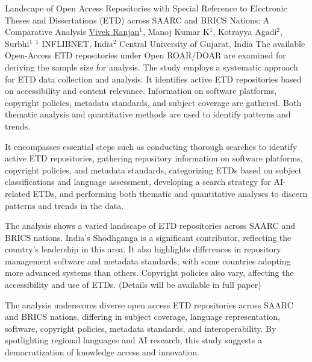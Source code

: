 \begin{abstract_online}{Landscape of Open Access Repositories with Special Reference to Electronic Theses and Dissertations (ETD) across SAARC and BRICS Nations: A Comparative Analysis}{%
        \underline{Vivek Ranjan}$^{1}$, Manoj Kumar K$^{1}$, Kotrayya  Agadi$^{2}$, Surbhi$^{1}$}{%
        }{%
        $^1$ INFLIBNET, India\newline{}$^2$ Central University of Gujarat, India}
        The available Open-Access ETD repositories under Open ROAR/DOAR are examined for deriving the sample size for analysis. The study employs a systematic approach for ETD data collection and analysis. It identifies active ETD repositories based on accessibility and content relevance. Information on software platforms, copyright policies, metadata standards, and subject coverage are gathered. Both thematic analysis and quantitative methods are used to identify patterns and trends.

        It encompasses essential steps such as conducting thorough searches to identify active ETD repositories, gathering repository information on software platforms, copyright policies, and metadata standards, categorizing ETDs based on subject classifications and language assessment, developing a search strategy for AI-related ETDs, and performing both thematic and quantitative analyses to discern patterns and trends in the data.

        The analysis shows a varied landscape of ETD repositories across SAARC and BRICS nations. India's Shodhganga is a significant contributor, reflecting the country's leadership in this area. It also highlights differences in repository management software and metadata standards, with some countries adopting more advanced systems than others. Copyright policies also vary, affecting the accessibility and use of ETDs. (Details will be available in full paper)

        The analysis underscores diverse open access ETD repositories across SAARC and BRICS nations, differing in subject coverage, language representation, software, copyright policies, metadata standards, and interoperability. By spotlighting regional languages and AI research, this study suggests a democratization of knowledge access and innovation.
    
    \end{abstract_online}
    
